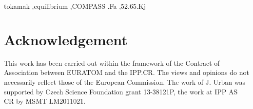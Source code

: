 \documentclass[preprint,5p,times]{elsarticle}
\begin{document}
\begin{frontmatter}


 
\begin{keyword}
tokamak  \sep equilibrium \sep COMPASS 
.Fa \sep 52.65.Kj
\end{keyword}

\end{frontmatter}






\section*{Acknowledgement}
This work has been carried out within the framework of the Contract of
Association between EURATOM and the IPP.CR.  The views and opinions do not necessarily reflect those
of the European Commission.
The work of J. Urban was supported by Czech Science Foundation grant 13-38121P,
the work at IPP AS CR by MSMT LM2011021.

% 



{}

% 

% 

% 
\end{document}
